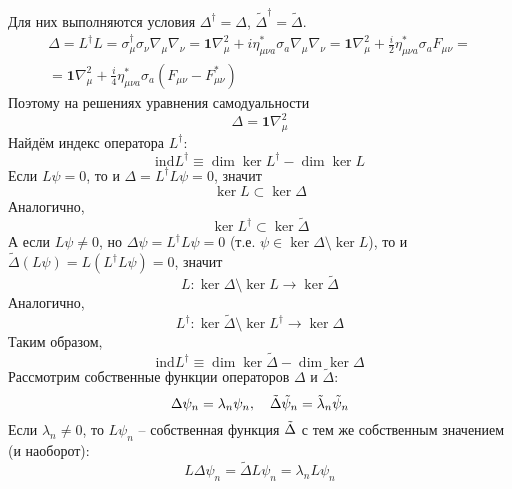 \documentclass[12pt]{article}
\theoremstyle{definition}
\begin{document}
Для них выполняются условия $\Delta^\dagger=\Delta$, $\tilde{\Delta}^\dagger=\tilde{\Delta}$.
\begin{multline}
    \Delta=L^\dagger L=\sigma_\mu^\dagger\sigma_\nu\nabla_\mu\nabla_\nu=\bm{1}\nabla_\mu^2+i\eta^*_{\mu\nu a}\sigma_a\nabla_\mu\nabla_\nu=\bm{1}\nabla_\mu^2+\frac{i}{2}\eta^*_{\mu\nu a}\sigma_aF_{\mu\nu}=\\=\bm{1}\nabla_\mu^2+\frac{i}{4}\eta^*_{\mu\nu a}\sigma_a(F_{\mu\nu}-F^*_{\mu\nu})
\end{multline}
Поэтому на решениях уравнения самодуальности
\begin{equation}
    \Delta=\bm{1}\nabla_\mu^2
\end{equation}
Найдём индекс оператора $L^\dagger$:
\begin{equation}
    \text{ind}L^\dagger\equiv\dim\ker L^\dagger-\dim\ker L
\end{equation}
Если $L\psi=0$, то и $\Delta=L^\dagger L\psi=0$, значит
\begin{equation}
    \ker L\subset\ker\Delta
\end{equation}
Аналогично,
\begin{equation}
    \ker L^\dagger\subset\ker\tilde{\Delta}
\end{equation}
А если $L\psi\neq0$, но $\Delta\psi=L^\dagger L\psi=0$ (т.е. $\psi\in\ker\Delta\setminus\ker L$), то и $\tilde{\Delta}(L\psi)=L(L^\dagger L\psi)=0$, значит 
\begin{equation}
    L:\ker\Delta\setminus\ker L\rightarrow\ker\tilde{\Delta}
\end{equation}
Аналогично,
\begin{equation}
    L^\dagger:\ker\tilde{\Delta}\setminus\ker L^\dagger\rightarrow\ker\Delta
\end{equation}
Таким образом,
\begin{equation}
    \text{ind}L^\dagger\equiv\dim\ker \tilde{\Delta}-\dim\ker\Delta
\end{equation}
Рассмотрим собственные функции операторов $\Delta$ и $\tilde{\Delta}$:
\begin{equation}
    \Delta\psi_n=\lambda_n\psi_n,\quad\Tilde{\Delta}\tilde{\psi}_n=\tilde{\lambda}_n\tilde{\psi}_n
\end{equation}
Если $\lambda_n\neq0$, то $L\psi_n$ -- собственная функция $\Tilde{\Delta}$ с тем же собственным значением (и наоборот):
\begin{equation}
    L\Delta\psi_n=\tilde{\Delta}L\psi_n=\lambda_n L\psi_n
\end{equation}
\end{document}
